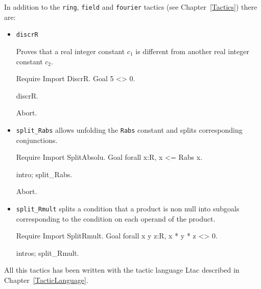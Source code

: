 In addition to the \verb|ring|, \verb|field| and \verb|fourier|
tactics (see Chapter~\ref{Tactics}) there are:
\begin{itemize}
\item {\tt discrR} 
  
  Proves that a real integer constant $c_1$ is different from another
  real integer constant $c_2$.  

\begin{coq_example*}
Require Import DiscrR.
Goal 5 <> 0.
\end{coq_example*}

\begin{coq_example}
discrR.
\end{coq_example}

\begin{coq_eval}
Abort.
\end{coq_eval}

\item {\tt split\_Rabs} allows unfolding the {\tt Rabs} constant and splits 
corresponding conjunctions.

\begin{coq_example*}
Require Import SplitAbsolu.
Goal forall x:R, x <= Rabs x.
\end{coq_example*}

\begin{coq_example}
intro; split_Rabs.
\end{coq_example}

\begin{coq_eval}
Abort.
\end{coq_eval}

\item {\tt split\_Rmult} splits a condition that a product is
  non null into subgoals corresponding to the condition on each
  operand of the product. 

\begin{coq_example*}
Require Import SplitRmult.
Goal forall x y z:R, x * y * z <> 0.
\end{coq_example*}

\begin{coq_example}
intros; split_Rmult.
\end{coq_example}

\end{itemize}

All this tactics has been written with the tactic language Ltac
described in Chapter~\ref{TacticLanguage}.

